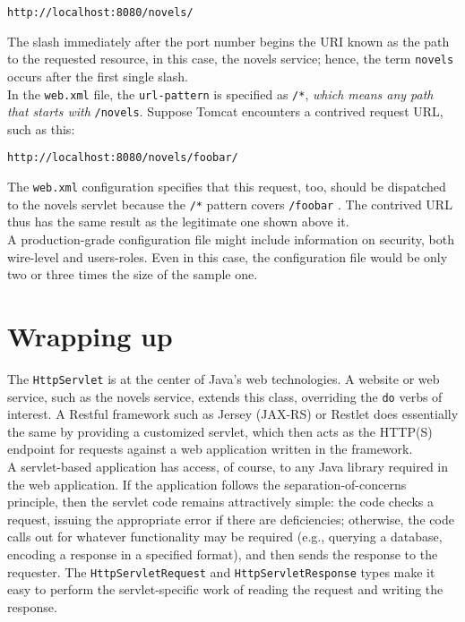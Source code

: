 \documentclass[12pt]{article}
\begin{document}
\begin{lstlisting}
http://localhost:8080/novels/

\end{lstlisting}

The slash immediately after the port number begins the URI known as the path to the requested resource, in this case, the novels service; hence, the term \verb|novels| occurs after the first single slash.\\

In the \verb|web.xml| file, the \verb|url-pattern| is specified as \verb|/*|, \textit{which means any path that starts with} \verb|/novels|. Suppose Tomcat encounters a contrived request URL, such as this:

\begin{lstlisting}
http://localhost:8080/novels/foobar/

\end{lstlisting}

The \verb|web.xml| configuration specifies that this request, too, should be dispatched to the novels servlet because the \verb|/*| pattern covers \verb|/foobar| . The contrived URL thus has the same result as the legitimate one shown above it.\\

A production-grade configuration file might include information on security, both wire-level and users-roles. Even in this case, the configuration file would be only two or three times the size of the sample one.

\section{Wrapping up}

The \verb|HttpServlet| is at the center of Java's web technologies. A website or web service, such as the novels service, extends this class, overriding the \verb|do| verbs of interest. A Restful framework such as Jersey (JAX-RS) or Restlet does essentially the same by providing a customized servlet, which then acts as the HTTP(S) endpoint for requests against a web application written in the framework.\\

A servlet-based application has access, of course, to any Java library required in the web application. If the application follows the separation-of-concerns principle, then the servlet code remains attractively simple: the code checks a request, issuing the appropriate error if there are deficiencies; otherwise, the code calls out for whatever functionality may be required (e.g., querying a database, encoding a response in a specified format), and then sends the response to the requester. The \verb|HttpServletRequest| and \verb|HttpServletResponse| types make it easy to perform the servlet-specific work of reading the request and writing the response.\\
\end{document}
